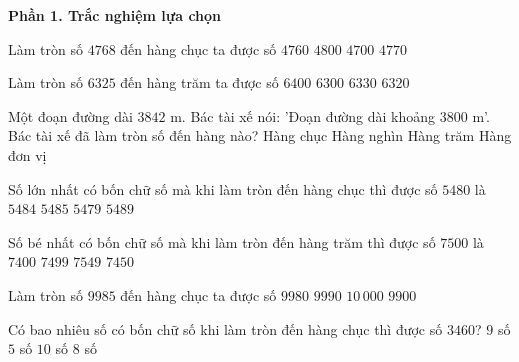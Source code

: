 \textbf{Phần 1. Trắc nghiệm lựa chọn}

\begin{ex} %
Làm tròn số $4768$ đến hàng chục ta được số
\choice
{$4760$}
{$4800$}
{$4700$}
{\True $4770$}
\end{ex}

\begin{ex} %
Làm tròn số $6325$ đến hàng trăm ta được số
\choice
{$6400$}
{\True $6300$}
{$6330$}
{$6320$}
\end{ex}

\begin{ex} %
Một đoạn đường dài $3842\text{ m}$. Bác tài xế nói: 'Đoạn đường dài khoảng $3800\text{ m}$'. Bác tài xế đã làm tròn số đến hàng nào?
\choice
{Hàng chục}
{Hàng nghìn}
{\True Hàng trăm}
{Hàng đơn vị}
\end{ex}

\begin{ex} %
Số lớn nhất có bốn chữ số mà khi làm tròn đến hàng chục thì được số $5480$ là
\choice
{\True $5484$}
{$5485$}
{$5479$}
{$5489$}
\end{ex}

\begin{ex} %
Số bé nhất có bốn chữ số mà khi làm tròn đến hàng trăm thì được số $7500$ là
\choice
{$7400$}
{$7499$}
{$7549$}
{\True $7450$}
\end{ex}

\begin{ex} %
Làm tròn số $9985$ đến hàng chục ta được số
\choice
{$9980$}
{\True $9990$}
{$10\,000$}
{$9900$}
\end{ex}

\begin{ex} %
Có bao nhiêu số có bốn chữ số khi làm tròn đến hàng chục thì được số $3460$?
\choice
{$9$ số}
{$5$ số}
{\True $10$ số}
{$8$ số}
\end{ex}

